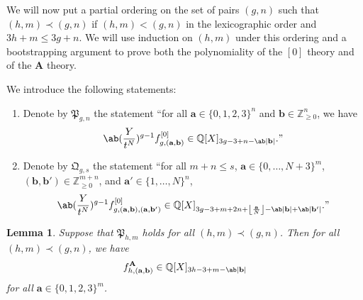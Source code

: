 \documentclass[10pt]{amsart}
\DeclarePairedDelimiter{\floor}{\lfloor}{\rfloor}
\newtheorem{lem}[thm]{Lemma}
\theoremstyle{definition}
\theoremstyle{remark}
\theoremstyle{plain}
\theoremstyle{definition}
\theoremstyle{remark}
\newcommand{\Z}{\mathbb{Z}}
\newcommand{\Q}{\mathbb{Q}}
\newcommand{\ba}{\mathbf{a}}
\newcommand{\bb}{\mathbf{b}}
\newcommand{\bA}{\mathbf{A}}
\newcommand{\mf}[1]{\mathfrak{#1}}
\newcommand{\1}{\mathbf{1}}
\newcommand{\2}{\mathbf{2}}
\newcommand{\3}{\mathbf{3}}
\numberwithin{equation}{section}
\begin{document}
We will now put a partial ordering on the set of pairs $(g,n)$ such that $(h,m) \prec (g,n)$ if $(h,m) < (g,n)$ in the lexicographic order and $3h+m \leq 3g+n$. We will use induction on $(h,m)$ under this ordering and a bootstrapping argument to prove both the polynomiality of the $[0]$ theory and of the $\bA$ theory.

We introduce the following statements:
\begin{enumerate}
    \item Denote by $\mf{P}_{g,n}$ the statement ``for all $\ba \in \{0,1,2,3\}^n$ and $\bb \in \Z_{\geq 0}^n$, we have 
        \[ \ab(\frac{Y}{t^N})^{g-1} f_{g,(\ba,\bb)}^{[0]} \in \Q[X]_{3g-3+n-\ab|\bb|}.\text{''} \]
    \item Denote by $\mf{Q}_{g,s}$ the statement ``for all $m+n \leq s$, $\ba \in \{0,\ldots,N+3\}^m$, $(\bb,\bb') \in \Z_{\geq 0}^{m+n}$, and $\ba' \in \{1,\ldots,N\}^n$, 
        \[\ab(\frac{Y}{t^N})^{g-1} f_{g,(\ba,\bb),(\ba,\bb')}^{[0]} \in \Q[X]_{3g-3+m+2n+\floor*{\frac{\ba}{N}}-\ab|\bb|+\ab|\bb'|}.\text{''} \]
\end{enumerate}

\begin{lem}\label{lem:Apolyassuming0poly}
    Suppose that $\mf{P}_{h,m}$ holds for all $(h,m) \prec (g,n)$. Then for all $(h,m) \prec (g,n)$, we have
    \[ f_{h,(\ba,\bb)}^{\bA} \in \Q[X]_{3h-3+m-\ab|\bb|} \]
    for all $\ba \in \{0,1,2,3\}^m$.
\end{lem}
\end{document}
